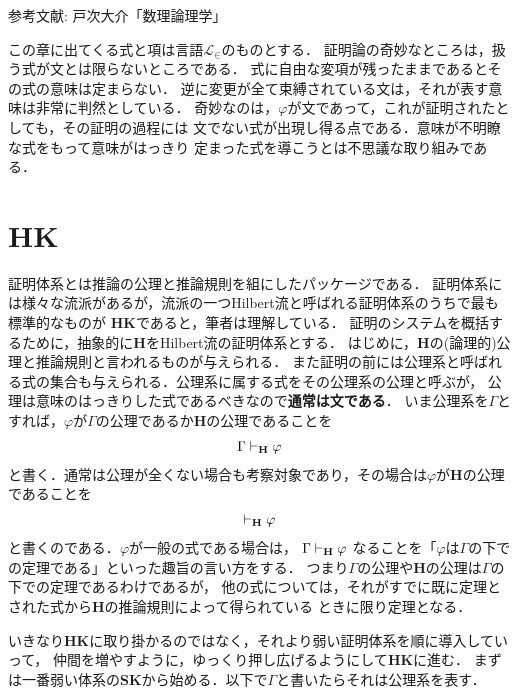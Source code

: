 	\begin{flushleft}
		参考文献: 戸次大介「数理論理学」
	\end{flushleft}
	
	この章に出てくる式と項は言語$\mathcal{L}_{\in}$のものとする．
	証明論の奇妙なところは，扱う式が文とは限らないところである．
	式に自由な変項が残ったままであるとその式の意味は定まらない．
	逆に変更が全て束縛されている文は，それが表す意味は非常に判然としている．
	奇妙なのは，$\varphi$が文であって，これが証明されたとしても，その証明の過程には
	文でない式が出現し得る点である．意味が不明瞭な式をもって意味がはっきり
	定まった式を導こうとは不思議な取り組みである．
	

\section{{\bf HK}}
	証明体系とは推論の公理と推論規則を組にしたパッケージである．
	証明体系には様々な流派があるが，流派の一つHilbert流と呼ばれる証明体系のうちで最も標準的なものが
	{\bf HK}であると，筆者は理解している．
	証明のシステムを概括するために，抽象的に{\bf H}をHilbert流の証明体系とする．
	はじめに，{\bf H}の(論理的)公理と推論規則と言われるものが与えられる．
	また証明の前には公理系と呼ばれる式の集合も与えられる．公理系に属する式をその公理系の公理と呼ぶが，
	公理は意味のはっきりした式であるべきなので{\bf 通常は文である}．
	いま公理系を$\Gamma$とすれば，$\varphi$が$\Gamma$の公理であるか{\bf H}の公理であることを
	\begin{align}
		\Gamma \vdash_{{\scriptsize \mbox{{\bf H}}}} \varphi
	\end{align}
	と書く．通常は公理が全くない場合も考察対象であり，その場合は$\varphi$が{\bf H}の公理であることを
	\begin{align}
		\vdash_{{\scriptsize \mbox{{\bf H}}}} \varphi
	\end{align}
	と書くのである．$\varphi$が一般の式である場合は，
	$\Gamma \vdash_{{\scriptsize \mbox{{\bf H}}}} \varphi$
	なることを「$\varphi$は$\Gamma$の下での定理である」といった趣旨の言い方をする．
	つまり$\Gamma$の公理や{\bf H}の公理は$\Gamma$の下での定理であるわけであるが，
	他の式については，それがすでに既に定理とされた式から{\bf H}の推論規則によって得られている
	ときに限り定理となる．
	
	いきなり{\bf HK}に取り掛かるのではなく，それより弱い証明体系を順に導入していって，
	仲間を増やすように，ゆっくり押し広げるようにして{\bf HK}に進む．
	まずは一番弱い体系の{\bf SK}から始める．以下で$\Gamma$と書いたらそれは公理系を表す．
	
